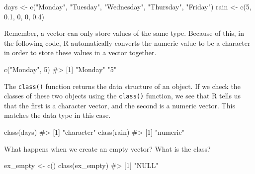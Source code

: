 \documentclass[
  letterpaper,
]{latex/krantz}
\makeatletter
\newenvironment{Shaded}{\begin{snugshade}}{\end{snugshade}}
\newcommand{\CommentTok}[1]{\textcolor[rgb]{0.37,0.37,0.37}{#1}}
\newcommand{\DecValTok}[1]{\textcolor[rgb]{0.68,0.00,0.00}{#1}}
\newcommand{\FloatTok}[1]{\textcolor[rgb]{0.68,0.00,0.00}{#1}}
\newcommand{\FunctionTok}[1]{\textcolor[rgb]{0.28,0.35,0.67}{#1}}
\newcommand{\NormalTok}[1]{\textcolor[rgb]{0.00,0.23,0.31}{#1}}
\newcommand{\OtherTok}[1]{\textcolor[rgb]{0.00,0.23,0.31}{#1}}
\newcommand{\StringTok}[1]{\textcolor[rgb]{0.13,0.47,0.30}{#1}}
\newenvironment{kframe}{%
\medskip{}
\setlength{\fboxsep}{.8em}
 \def\at@end@of@kframe{}%
 \ifinner\ifhmode%
  \def\at@end@of@kframe{\end{minipage}}%
  \begin{minipage}{\columnwidth}%
 \fi\fi%
 \def\FrameCommand##1{\hskip\@totalleftmargin \hskip-\fboxsep
 \colorbox{shadecolor}{##1}\hskip-\fboxsep
     \hskip-\linewidth \hskip-\@totalleftmargin \hskip\columnwidth}%
 \MakeFramed {\advance\hsize-\width
   \@totalleftmargin\z@ \linewidth\hsize
   \@setminipage}}%
 {\par\unskip\endMakeFramed%
 \at@end@of@kframe}
\renewenvironment{Shaded}{\begin{kframe}}{\end{kframe}}
\makeatother
\begin{document}
\begin{Shaded}
\begin{Highlighting}[]
\NormalTok{days }\OtherTok{\textless{}{-}} \FunctionTok{c}\NormalTok{(}\StringTok{"Monday"}\NormalTok{, }\StringTok{"Tuesday"}\NormalTok{, }\StringTok{"Wednesday"}\NormalTok{, }\StringTok{"Thursday"}\NormalTok{, }\StringTok{"Friday"}\NormalTok{)}
\NormalTok{rain }\OtherTok{\textless{}{-}} \FunctionTok{c}\NormalTok{(}\DecValTok{5}\NormalTok{, }\FloatTok{0.1}\NormalTok{, }\DecValTok{0}\NormalTok{, }\DecValTok{0}\NormalTok{, }\FloatTok{0.4}\NormalTok{)}
\end{Highlighting}
\end{Shaded}

Remember, a vector can only store values of the same type. Because of
this, in the following code, R automatically converts the numeric value
to be a character in order to store these values in a vector together.

\begin{Shaded}
\begin{Highlighting}[]
\FunctionTok{c}\NormalTok{(}\StringTok{"Monday"}\NormalTok{, }\DecValTok{5}\NormalTok{)}
\CommentTok{\#\textgreater{} [1] "Monday" "5"}
\end{Highlighting}
\end{Shaded}

The \texttt{class()}
function returns the data structure of an object. If we check the
classes of these two objects using the \texttt{class()} function, we see
that R tells us that the first is a character vector, and the second is
a numeric vector. This matches the data type in this case.

\begin{Shaded}
\begin{Highlighting}[]
\FunctionTok{class}\NormalTok{(days)}
\CommentTok{\#\textgreater{} [1] "character"}
\FunctionTok{class}\NormalTok{(rain)}
\CommentTok{\#\textgreater{} [1] "numeric"}
\end{Highlighting}
\end{Shaded}

What happens when we create an empty vector? What is the class?

\begin{Shaded}
\begin{Highlighting}[]
\NormalTok{ex\_empty }\OtherTok{\textless{}{-}} \FunctionTok{c}\NormalTok{()}
\FunctionTok{class}\NormalTok{(ex\_empty)}
\CommentTok{\#\textgreater{} [1] "NULL"}
\end{Highlighting}
\end{Shaded}
\end{document}
